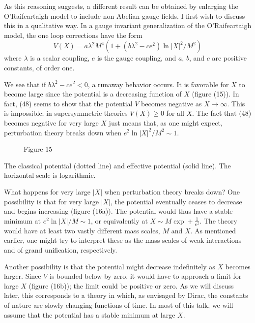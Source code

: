 As this reasoning suggests, a different result can be obtained
by enlarging the O'Raifeartaigh model to include non-Abelian gauge
fields. I first wish to discuss this in a qualitative way. In a
gauge invariant generalization of the O'Raifeartaigh model, the one
loop corrections have the form
\begin{equation}
V(X) = a\lambda^2 M^4 \left(1 + (b\lambda^2 - ce^2)\ln |X|^2/M^2\right)
\tag{48}
\end{equation}
where $\lambda$ is a scalar coupling, $e$ is the gauge coupling, and $a$, $b$, and
$c$ are positive constants, of order one.

We see that if $b\lambda^2 - ce^2 < 0$, a runaway behavior occurs. It is
favorable for $X$ to become large since the potential is a decreasing
function of $X$ (figure (15)). In
fact, (48) seems to show that the
potential $V$ becomes negative as
$X \to \infty$. This is impossible; in
supersymmetric theories $V(X) \geq 0$
for all $X$. The fact that (48)
becomes negative for very large $X$
just means that, as one might expect, perturbation theory breaks
down when $e^2 \ln |X|^2/M^2 \sim 1$.

\begin{figure}[h]
\centering

\caption*{Figure 15}
\end{figure}

The classical potential (dotted
line) and effective potential
(solid line). The horizontal
scale is logarithmic.

What happens for very large $|X|$ when perturbation theory breaks
down? One possibility is that for very large $|X|$, the potential
eventually ceases to decrease and begins increasing (figure (16a)).
The potential would thus have a stable minimum at $e^2 \ln |X|/M \sim 1$,
or equivalently at $X \sim M \exp + \frac{1}{e^2}$. The theory would have at least
two vastly different mass scales, $M$ and $X$. As mentioned earlier,
one might try to interpret these as the mass scales of weak interactions
and of grand unification, respectively.

Another possibility is that the potential might decrease indefinitely
as $X$ becomes larger. Since $V$ is bounded below by zero,
it would have to approach a limit for large $X$ (figure (16b)); the
limit could be positive or zero. As we will discuss later, this corresponds
to a theory in which, as envisaged by Dirac, the constants
of nature are slowly changing functions of time. In most of this
talk, we will assume that the potential has a stable minimum at
large $X$.


